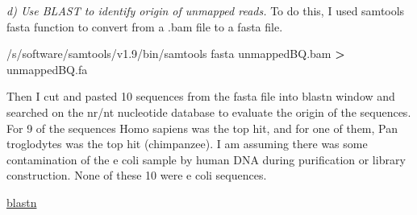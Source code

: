 \documentclass[]{article}
\newenvironment{Shaded}{\begin{snugshade}}{\end{snugshade}}
\newcommand{\OperatorTok}[1]{\textcolor[rgb]{0.81,0.36,0.00}{\textbf{#1}}}
\newcommand{\ExtensionTok}[1]{#1}
\newcommand{\NormalTok}[1]{#1}
\begin{document}
\emph{d) Use BLAST to identify origin of unmapped reads.} To do this, I
used samtools fasta function to convert from a .bam file to a fasta
file.

\begin{Shaded}
\begin{Highlighting}[]
\ExtensionTok{/s/software/samtools/v1.9/bin/samtools}\NormalTok{ fasta unmappedBQ.bam }\OperatorTok{>}\NormalTok{ unmappedBQ.fa}
\end{Highlighting}
\end{Shaded}

Then I cut and pasted 10 sequences from the fasta file into blastn
window and searched on the nr/nt nucleotide database to evaluate the
origin of the sequences. For 9 of the sequences Homo sapiens was the top
hit, and for one of them, Pan troglodytes was the top hit (chimpanzee).
I am assuming there was some contamination of the e coli sample by human
DNA during purification or library construction. None of these 10 were e
coli sequences.

\href{https://blast.ncbi.nlm.nih.gov/Blast.cgi?CMD=Web\&PAGE_TYPE=BlastDocs\&DOC_TYPE=BlastHelp}{blastn}
\end{document}

